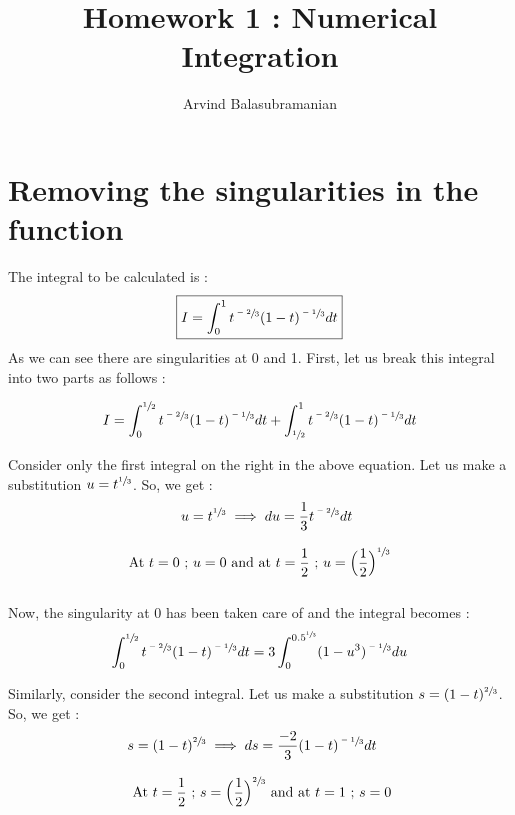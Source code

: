 \documentclass[a4paper,10pt]{article}
\title{\textbf{Homework 1 : Numerical Integration}}
\author{Arvind Balasubramanian}
\begin{document}
\maketitle
\section*{Removing the singularities in the function}

The integral to be calculated is :
\begin{equation*}
 \boxed{I = \int_{0}^{1} t^{\sfrac{-2}{3}} (1-t)^{\sfrac{-1}{3}} dt}
\end{equation*}
As we can see there are singularities at 0 and 1. First, let us break this integral into two parts as follows :

\begin{equation*}
 I = \int_{0}^{\sfrac{1}{2}} t^{\sfrac{-2}{3}} (1-t)^{\sfrac{-1}{3}} dt + \int_{\sfrac{1}{2}}^{1} t^{\sfrac{-2}{3}} (1-t)^{\sfrac{-1}{3}} dt
\end{equation*}

Consider only the first integral on the right in the above equation. Let us make a substitution $ u = t^{\sfrac{1}{3}}$. So, we get :
\begin{equation*}
 \begin{split}
  u = t^{\sfrac{1}{3}} & \implies du = \frac{1}{3} t^{\sfrac{-2}{3}} dt \\
  \\
  \text{At } t = 0 \text{ ; } u = 0 & \text{ and at } t = \frac{1}{2} \text{ ; } u = \Big(\frac{1}{2}\Big)^{\sfrac{1}{3}}\\
  \\
  \end{split}  
\end{equation*}

Now, the singularity at 0 has been taken care of and the integral becomes :
\begin{equation*}
 \int_{0}^{\sfrac{1}{2}} t^{\sfrac{-2}{3}} (1-t)^{\sfrac{-1}{3}} dt = 3 \int_{0}^{0.5^{\sfrac{1}{3}}} (1-u^{3})^{\sfrac{-1}{3}} du
\end{equation*}

Similarly, consider the second integral. Let us make a substitution $ s = (1-t)^{\sfrac{2}{3}}$. So, we get :
\begin{equation*}
 \begin{split}
  s = (1-t)^{\sfrac{2}{3}} & \implies ds = \frac{-2}{3} (1-t)^{\sfrac{-1}{3}} dt \\
  \\
  \text{At } t = \frac{1}{2} \text{ ; } s & = \Big(\frac{1}{2}\Big)^{\sfrac{2}{3}} \text{ and at } t = 1 \text{ ; } s = 0\\
  \\
  \end{split}  
\end{equation*}
\end{document}
